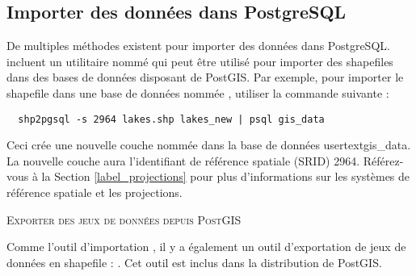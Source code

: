 \subsection{Importer des données dans PostgreSQL} \label{sec:loading_postgis_data}

De multiples méthodes existent pour importer des données dans 
PostgreSQL. \pg incluent un utilitaire nommé  
qui peut être utilisé pour importer des shapefiles dans des bases 
de données disposant de PostGIS. Par exemple, pour importer le 
shapefile  dans une base de données \psq 
nommée , utiliser la commande suivante :

\begin{verbatim}
  shp2pgsql -s 2964 lakes.shp lakes_new | psql gis_data
\end{verbatim}

Ceci crée une nouvelle couche nommée  dans la 
base de données usertext{gis\_data}. La nouvelle couche aura 
l'identifiant de référence spatiale (SRID) 2964. Référez-vous 
à la Section \ref{label_projections} pour plus d'informations sur 
les systèmes de référence spatiale et les projections.
\begin{Tip}
\caption{\textsc{Exporter des jeux de données depuis PostGIS}}
Comme l'outil d'importation , il y a également 
un outil d'exportation de jeux de données \pg en shapefile : 
. Cet outil est inclus dans la distribution de 
PostGIS.
\end{Tip}

